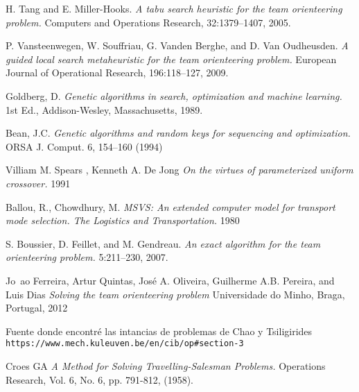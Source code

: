 \begin{thebibliography}{9}
H. Tang and E. Miller-Hooks.
\textit{A tabu search heuristic for the team orienteering problem.}
Computers and Operations Research, 32:1379–1407, 2005.

P. Vansteenwegen, W. Souffriau, G. Vanden Berghe, and D. Van Oudheusden.
\textit{A guided local search metaheuristic for the team orienteering problem.}
European Journal of Operational Research, 196:118–127, 2009.

Goldberg, D.
\textit{Genetic algorithms in search, optimization and machine learning.}
1st Ed., Addison-Wesley, Massachusetts, 1989.

Bean, J.C.
\textit{Genetic algorithms and random keys for sequencing and optimization.}
ORSA J. Comput. 6, 154–160 (1994)

Villiam M. Spears , Kenneth A. De Jong
\textit{On the virtues of parameterized uniform crossover.}
1991

Ballou, R., Chowdhury, M.
\textit{MSVS: An extended computer model for transport mode selection. The Logistics and Transportation.}
1980

S. Boussier, D. Feillet, and M. Gendreau.
\textit{An exact algorithm for the team orienteering problem.}
5:211–230, 2007.

Jo~ao Ferreira, Artur Quintas, José A. Oliveira, Guilherme A.B. Pereira, and Luis Dias
\textit{Solving the team orienteering problem}
Universidade do Minho, Braga, Portugal, 2012

Fuente donde encontré las intancias de problemas de Chao y Tsiligirides
\\\texttt{https://www.mech.kuleuven.be/en/cib/op\#section-3}

Croes GA
\textit{A Method for Solving Travelling-Salesman Problems.}
Operations Research, Vol. 6, No. 6, pp. 791-812, (1958).

\end{thebibliography}